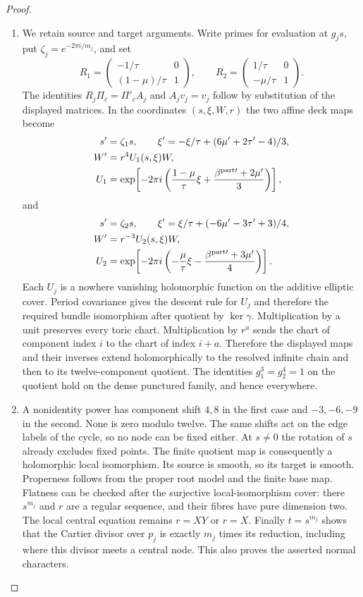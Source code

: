\begin{proof}
\begin{enumerate}[label=\arabic*.,leftmargin=*]
\item We retain source and target arguments. Write primes for
evaluation at $g_js$, put $\zeta_j=e^{-2\pi i/m_j}$,
and set
\[
 R_1=\begin{pmatrix}-1/\tau&0\\(1-\mu)/\tau&1\end{pmatrix},
 \qquad
 R_2=\begin{pmatrix}1/\tau&0\\-\mu/\tau&1\end{pmatrix}.
\]
The identities $R_j\Pi_c=\Pi'_c A_j$ and $A_jv_j=v_j$
follow by substitution of the displayed matrices. In the coordinates
$(s,\xi,W,r)$ the two affine deck maps become
\begin{align*}
 s'&=\zeta_1s,\qquad
 \xi'=-\xi/\tau+(6\mu'+2\tau'-4)/3,\\
 W'&=r^4 U_1(s,\xi)W,\\
 U_1&=\exp\!\left[-2\pi i
  \left(\frac{1-\mu}{\tau}\xi+
        \frac{\beta^{{\rm part}\prime}+2\mu'}3\right)\right],
 \end{align*}
and
\begin{align*}
 s'&=\zeta_2s,\qquad
 \xi'=\xi/\tau+(-6\mu'-3\tau'+3)/4,\\
 W'&=r^{-3} U_2(s,\xi)W,\\
 U_2&=\exp\!\left[-2\pi i
  \left(-\frac{\mu}{\tau}\xi-
        \frac{\beta^{{\rm part}\prime}+3\mu'}4\right)\right].
 \end{align*}
Each $U_j$ is a nowhere vanishing holomorphic function on
the additive elliptic cover. Period covariance gives the descent rule for $U_j$ and
therefore the required bundle isomorphism after quotient
by $\ker\gamma$. Multiplication by a unit preserves every toric chart.
Multiplication by $r^a$ sends the chart of component index
$i$ to the chart of index $i+a$. Therefore the displayed
maps and their inverses extend holomorphically to the
resolved infinite chain and then to its twelve-component
quotient. The identities $g_1^3=g_2^4=1$ on the quotient
hold on the dense punctured family, and hence everywhere.

\item A nonidentity power has component shift $4,8$ in the first
case and $-3,-6,-9$ in the second. None is zero modulo
twelve. The same shifts act on the edge labels of the
cycle, so no node can be fixed either. At $s\ne0$ the
rotation of $s$ already excludes fixed points. The finite
quotient map is consequently a holomorphic local
isomorphism. Its source is smooth, so its target is smooth.
Properness follows from the proper root model and the
finite base map. Flatness can be checked after the
surjective local-isomorphism cover: there $s^{m_j}$ and
$r$ are a regular sequence, and their fibres have pure
dimension two. The local central equation remains
$r=XY$ or $r=X$. Finally $t=s^{m_j}$ shows that the
Cartier divisor over $p_j$ is exactly $m_j$ times its
reduction, including where this divisor meets a central
node. This also proves the asserted normal characters.


\end{enumerate}
\end{proof}
